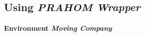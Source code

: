 \documentclass{ecai}
\newcommand{\probP}{\text{I\kern-0.15em P}}
\begin{document}









\subsection{Using \emph{PRAHOM Wrapper}}

\paragraph{Environment \emph{Moving Company}}
\end{document}
